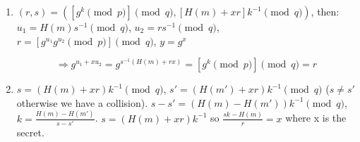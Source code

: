 \begin{solution}
  \begin{enumerate}
    \item
      $(r, s) = ([g^k \pmod{p}] \pmod{q}, [H(m) + xr]k^{-1} \pmod{q})$, then:
      $u_1 = H(m)s^{-1} \pmod{q}$,  $u_2 = rs^{-1} \pmod{q}$, $r = [g^{u_1} g^{u_2} \pmod{p}] \pmod{q}$, $y = g^x$

      $$\Rightarrow g^{u_1 + xu_2} = g^{s^{-1}(H(m) + rx)} = [g^k \pmod{p}] \pmod{q} = r$$
    \item
      $s = (H(m) + xr)k^{-1} \pmod{q}$, $s' = (H(m') + xr)k^{-1} \pmod{q}$ ($s \neq s'$ otherwise we have a collision).
      $s - s' = (H(m) - H(m'))k^{-1} \pmod{q}$, $k = \frac{H(m) - H(m')}{s - s'}$.
      $s = (H(m) + xr)k^{-1}$ so $\frac{sk - H(m)}{r} = x$ where x is the secret.
  \end{enumerate}
\end{solution}

